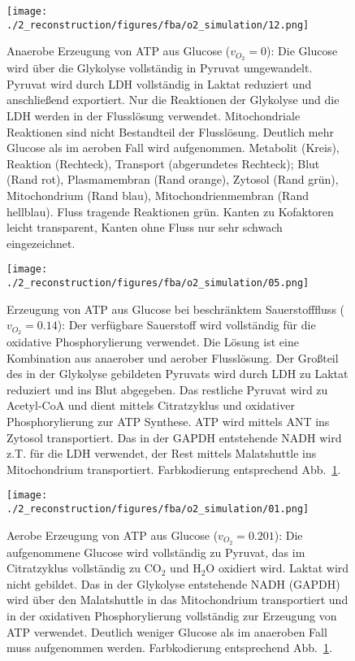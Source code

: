 \begin{figure}[!htp]
 \centering
 \texttt{[image: ./2\_reconstruction/figures/fba/o2\_simulation/12.png]}%
 \caption{Anaerobe Erzeugung von ATP aus Glucose ($v_{O_2}=0$): Die Glucose wird über die Glykolyse vollständig in Pyruvat umgewandelt. Pyruvat wird durch LDH vollständig in Laktat reduziert und anschließend exportiert. Nur die Reaktionen der Glykolyse und die LDH werden in der Flusslösung verwendet. Mitochondriale Reaktionen sind nicht Bestandteil der Flusslösung. Deutlich mehr Glucose als im aeroben Fall wird aufgenommen. Metabolit (Kreis), Reaktion (Rechteck), Transport (abgerundetes Rechteck); Blut (Rand rot), Plasmamembran (Rand orange), Zytosol (Rand grün), Mitochondrium (Rand blau), Mitochondrienmembran (Rand hellblau). Fluss tragende Reaktionen grün. Kanten zu Kofaktoren leicht transparent, Kanten ohne Fluss nur sehr schwach eingezeichnet.}
 \label{fig: o2_anaerob}
\end{figure}

\begin{figure}[!htp]
 \centering
 \texttt{[image: ./2\_reconstruction/figures/fba/o2\_simulation/05.png]}%
 \caption{Erzeugung von ATP aus Glucose bei beschränktem Sauerstofffluss ($v_{O_2}=0.14$): Der verfügbare Sauerstoff wird vollständig für die oxidative Phosphorylierung verwendet. Die Lösung ist eine Kombination aus anaerober und aerober Flusslösung. Der Großteil des in der Glykolyse gebildeten Pyruvats wird durch LDH zu Laktat reduziert und ins Blut abgegeben. Das restliche Pyruvat wird zu Acetyl-CoA und dient mittels Citratzyklus und oxidativer Phosphorylierung zur ATP Synthese. ATP wird mittels ANT ins Zytosol transportiert. Das in der GAPDH entstehende NADH wird z.T. für die LDH verwendet, der Rest mittels Malatshuttle ins Mitochondrium transportiert. Farbkodierung entsprechend Abb.~\ref{fig: o2_anaerob}.}
 \label{fig: o2_restricted}
\end{figure}

\begin{figure}[!htp]
 \centering
 \texttt{[image: ./2\_reconstruction/figures/fba/o2\_simulation/01.png]}%
 \caption{Aerobe Erzeugung von ATP aus Glucose ($v_{O_2}=0.201$): Die aufgenommene Glucose wird vollständig zu Pyruvat, das im Citratzyklus vollständig zu $\text{CO}_2$ und $\text{H}_2\text{O}$ oxidiert wird. Laktat wird nicht gebildet. Das in der Glykolyse entstehende NADH (GAPDH) wird über den Malatshuttle in das Mitochondrium transportiert und in der oxidativen Phosphorylierung vollständig zur Erzeugung von ATP verwendet. Deutlich weniger Glucose als im anaeroben Fall muss aufgenommen werden. Farbkodierung entsprechend Abb.~\ref{fig: o2_anaerob}.}
 \label{fig: o2_aerob}
\end{figure}

